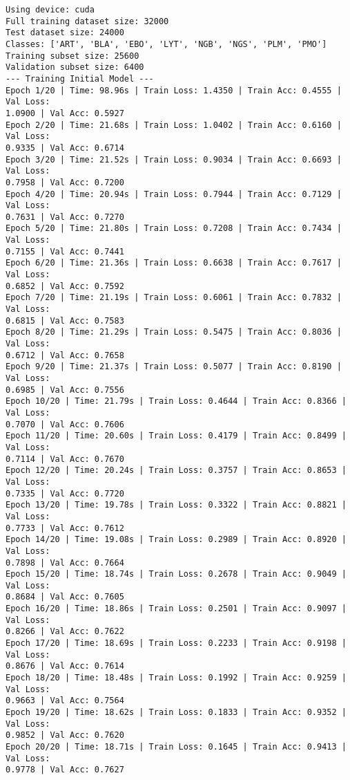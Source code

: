\documentclass[11pt]{article}
\begin{document}
    \begin{Verbatim}[commandchars=\\\{\}]
Using device: cuda
Full training dataset size: 32000
Test dataset size: 24000
Classes: ['ART', 'BLA', 'EBO', 'LYT', 'NGB', 'NGS', 'PLM', 'PMO']
Training subset size: 25600
Validation subset size: 6400
--- Training Initial Model ---
Epoch 1/20 | Time: 98.96s | Train Loss: 1.4350 | Train Acc: 0.4555 | Val Loss:
1.0900 | Val Acc: 0.5927
Epoch 2/20 | Time: 21.68s | Train Loss: 1.0402 | Train Acc: 0.6160 | Val Loss:
0.9335 | Val Acc: 0.6714
Epoch 3/20 | Time: 21.52s | Train Loss: 0.9034 | Train Acc: 0.6693 | Val Loss:
0.7958 | Val Acc: 0.7200
Epoch 4/20 | Time: 20.94s | Train Loss: 0.7944 | Train Acc: 0.7129 | Val Loss:
0.7631 | Val Acc: 0.7270
Epoch 5/20 | Time: 21.80s | Train Loss: 0.7208 | Train Acc: 0.7434 | Val Loss:
0.7155 | Val Acc: 0.7441
Epoch 6/20 | Time: 21.36s | Train Loss: 0.6638 | Train Acc: 0.7617 | Val Loss:
0.6852 | Val Acc: 0.7592
Epoch 7/20 | Time: 21.19s | Train Loss: 0.6061 | Train Acc: 0.7832 | Val Loss:
0.6815 | Val Acc: 0.7583
Epoch 8/20 | Time: 21.29s | Train Loss: 0.5475 | Train Acc: 0.8036 | Val Loss:
0.6712 | Val Acc: 0.7658
Epoch 9/20 | Time: 21.37s | Train Loss: 0.5077 | Train Acc: 0.8190 | Val Loss:
0.6985 | Val Acc: 0.7556
Epoch 10/20 | Time: 21.79s | Train Loss: 0.4644 | Train Acc: 0.8366 | Val Loss:
0.7070 | Val Acc: 0.7606
Epoch 11/20 | Time: 20.60s | Train Loss: 0.4179 | Train Acc: 0.8499 | Val Loss:
0.7114 | Val Acc: 0.7670
Epoch 12/20 | Time: 20.24s | Train Loss: 0.3757 | Train Acc: 0.8653 | Val Loss:
0.7335 | Val Acc: 0.7720
Epoch 13/20 | Time: 19.78s | Train Loss: 0.3322 | Train Acc: 0.8821 | Val Loss:
0.7733 | Val Acc: 0.7612
Epoch 14/20 | Time: 19.08s | Train Loss: 0.2989 | Train Acc: 0.8920 | Val Loss:
0.7898 | Val Acc: 0.7664
Epoch 15/20 | Time: 18.74s | Train Loss: 0.2678 | Train Acc: 0.9049 | Val Loss:
0.8684 | Val Acc: 0.7605
Epoch 16/20 | Time: 18.86s | Train Loss: 0.2501 | Train Acc: 0.9097 | Val Loss:
0.8266 | Val Acc: 0.7622
Epoch 17/20 | Time: 18.69s | Train Loss: 0.2233 | Train Acc: 0.9198 | Val Loss:
0.8676 | Val Acc: 0.7614
Epoch 18/20 | Time: 18.48s | Train Loss: 0.1992 | Train Acc: 0.9259 | Val Loss:
0.9663 | Val Acc: 0.7564
Epoch 19/20 | Time: 18.62s | Train Loss: 0.1833 | Train Acc: 0.9352 | Val Loss:
0.9852 | Val Acc: 0.7620
Epoch 20/20 | Time: 18.71s | Train Loss: 0.1645 | Train Acc: 0.9413 | Val Loss:
0.9778 | Val Acc: 0.7627
    \end{Verbatim}

    \begin{center}
    \end{center}
    { \hspace*{\fill} \\}
    
\end{document}

